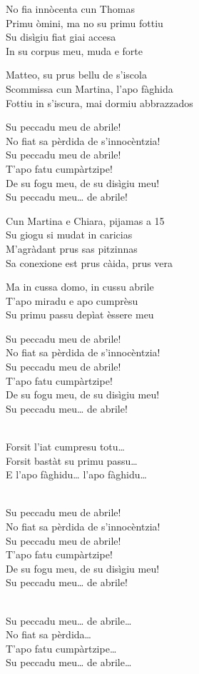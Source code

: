 \begin{lyrics}

No fia innòcenta cun Thomas\\
Primu òmini, ma no su primu fottiu\\
Su disìgiu fiat giai accesa\\
In su corpus meu, muda e forte

Matteo, su prus bellu de s’iscola\\
Scommissa cun Martina, l’apo fàghida\\
Fottiu in s’iscura, mai dormiu abbrazzados

Su peccadu meu de abrile!\\
No fiat sa pèrdida de s’innocèntzia!\\
Su peccadu meu de abrile!\\
T’apo fatu cumpàrtzipe!\\
De su fogu meu, de su disìgiu meu!\\
Su peccadu meu… de abrile!

Cun Martina e Chiara, pijamas a 15\\
Su giogu si mudat in caricias\\
M’agràdant prus sas pitzinnas\\
Sa conexione est prus càida, prus vera

Ma in cussa domo, in cussu abrile\\
T’apo miradu e apo cumprèsu\\
Su primu passu depìat èssere meu

Su peccadu meu de abrile!\\
No fiat sa pèrdida de s’innocèntzia!\\
Su peccadu meu de abrile!\\
T’apo fatu cumpàrtzipe!\\
De su fogu meu, de su disìgiu meu!\\
Su peccadu meu… de abrile!

\\
Forsit l’iat cumpresu totu…\\
Forsit bastàt su primu passu…\\
E l’apo fàghidu… l’apo fàghidu…

\\
Su peccadu meu de abrile!\\
No fiat sa pèrdida de s’innocèntzia!\\
Su peccadu meu de abrile!\\
T’apo fatu cumpàrtzipe!\\
De su fogu meu, de su disìgiu meu!\\
Su peccadu meu… de abrile!

\\
Su peccadu meu… de abrile…\\
No fiat sa pèrdida…\\
T’apo fatu cumpàrtzipe…\\
Su peccadu meu… de abrile…

\end{lyrics}

